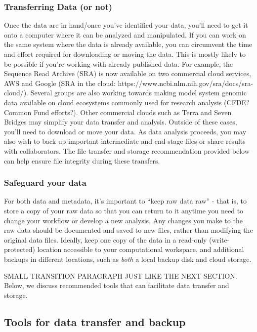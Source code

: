 \documentclass[10pt,letterpaper]{article}
\begin{document}
\subsubsection*{Transferring Data (or not)} 
Once the data are in hand/once you've identified your data, you'll need to get it onto a computer where it can be analyzed and manipulated. If you can work on the same system where the data is already available, you can circumvent the time and effort required for downloading or moving the data. This is mostly likely to be possible if you’re working with already published data. For example, the Sequence Read Archive (SRA) is now available on two commercial cloud services, AWS and Google (SRA in the cloud: https://www.ncbi.nlm.nih.gov/sra/docs/sra-cloud/). Several groups are also working towards making model system genomic data available on cloud ecosystems commonly used for research analysis (CFDE? Common Fund efforts?). Other commercial clouds such as Terra and Seven Bridges may simplify your data transfer and analysis. Outside of these cases, you’ll need to download or move your data.  As data analysis proceeds, you may also wish to back up important intermediate and end-stage files or share results with collaborators. The file transfer and storage recommendation provided below can help ensure file integrity during these transfers.

\subsubsection*{Safeguard your data} 
For both data and metadata, it’s important to “keep raw data raw” - that is, to store a copy of your raw data so that you can return to it anytime you need to change your workflow or develop a new analysis. Any changes you make to the raw data should be documented and saved to new files, rather than modifying the original data files. Ideally, keep one copy of the data in a read-only (write-protected) location accessible to your computational workspace, and additional backups in different locations, such as \textit{both} a local backup disk and cloud storage. 

SMALL TRANSITION PARAGRAPH JUST LIKE THE NEXT SECTION. Below, we discuss recommended tools that can facilitate data transfer and storage. 

\subsection*{Tools for data transfer and backup} %
\end{document}

